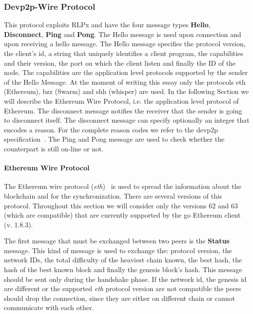 \subsubsection{Devp2p-Wire Protocol}

This protocol exploits RLPx and have the four message types
\textbf{Hello}, \textbf{Disconnect}, \textbf{Ping} and \textbf{Pong}.
The Hello message is used upon connection and upon receiving a hello message.
The Hello message specifies the protocol version, the client's id,
a string that uniquely identifies a client program, the capabilities and their
version, the port on which the client listen and finally the ID of the node.
The capabilities are the application level protocols supported by the sender
of the Hello Message. At the moment of writing this essay only the protocols
eth (Ethereum), bzz (Swarm) and shh (whisper) are used. In the following
Section we will describe the Ethereum Wire Protocol, i.e. the application
level protocol of Ethereum.
The disconnect message notifies the receiver that the sender is going to
disconnect itself. The disconnect message can specify optionally an
integer that encodes a reason.
For the complete reason codes we refer to the devp2p specification~\cite{}.
The Ping and Pong message are used to check whether the counterpart is still
on-line or not.

\paragraph{Ethereum Wire Protocol}
The Ethereum wire protocol
(\textit{eth})~\cite{bib:ethereumwireprotocol} is used to spread the information
about the blockchain and for the synchronization. There are several versions
of this protocol. Throughout this section we will consider only the versions
$62$ and $63$ (which are compatible) that are currently supported by the go
Ethereum client (v. 1.8.3).

The first message that must be exchanged between two peers
is the \textbf{Status} message. This kind of message is used to exchange
the: protocol version, the network IDs, the total difficulty of the
heaviest chain known, the best hash, the hash of the best known block and
finally the genesis block's hash. This message should be sent only during
the handshake phase.
If the network id, the genesis id are different or the supported
\textit{eth} protocol version are not compatible the peers should
drop the connection, since they are either on different chain or cannot
communicate with each other.

